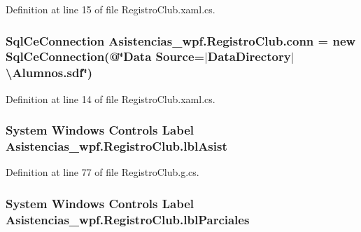 Definition at line 15 of file Registro\-Club.\-xaml.\-cs.

\hypertarget{class_asistencias__wpf_1_1_registro_club_aa77e1bfb5b4bbe468f86ddd6264fad53}{
\subsubsection[{conn}]{\setlength{\rightskip}{0pt plus 5cm}Sql\-Ce\-Connection Asistencias\-\_\-wpf.\-Registro\-Club.\-conn = new Sql\-Ce\-Connection(@\char`\"{}Data Source=$|$Data\-Directory$|$\textbackslash{}Alumnos.\-sdf\char`\"{})\hspace{0.3cm}{\ttfamily [private]}}}\label{class_asistencias__wpf_1_1_registro_club_aa77e1bfb5b4bbe468f86ddd6264fad53}


Definition at line 14 of file Registro\-Club.\-xaml.\-cs.

\hypertarget{class_asistencias__wpf_1_1_registro_club_a974cf03e0b78ba0f297e64b0143ff51c}{
\subsubsection[{lbl\-Asist}]{\setlength{\rightskip}{0pt plus 5cm}System Windows Controls Label Asistencias\-\_\-wpf.\-Registro\-Club.\-lbl\-Asist\hspace{0.3cm}{\ttfamily [package]}}}\label{class_asistencias__wpf_1_1_registro_club_a974cf03e0b78ba0f297e64b0143ff51c}


Definition at line 77 of file Registro\-Club.\-g.\-cs.

\hypertarget{class_asistencias__wpf_1_1_registro_club_af0b4a33c9ec145c096e5827435a5e58c}{
\subsubsection[{lbl\-Parciales}]{\setlength{\rightskip}{0pt plus 5cm}System Windows Controls Label Asistencias\-\_\-wpf.\-Registro\-Club.\-lbl\-Parciales\hspace{0.3cm}{\ttfamily [package]}}}\label{class_asistencias__wpf_1_1_registro_club_af0b4a33c9ec145c096e5827435a5e58c}


